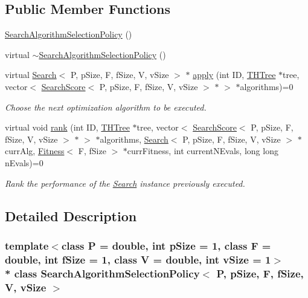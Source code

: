 \subsection*{Public Member Functions}
\begin{DoxyCompactItemize}
\item 
\hyperlink{classSearchAlgorithmSelectionPolicy_aeb650cf636c331f5842eb5acfc963a35}{Search\+Algorithm\+Selection\+Policy} ()
\item 
virtual \hyperlink{classSearchAlgorithmSelectionPolicy_a34e87d6c833a38bb19992aeed37205b2}{$\sim$\+Search\+Algorithm\+Selection\+Policy} ()
\item 
virtual \hyperlink{classSearch}{Search}$<$ P, p\+Size, F, f\+Size, V, v\+Size $>$ $\ast$ \hyperlink{classSearchAlgorithmSelectionPolicy_a0f316179ba1d9590efa74cac86eac777}{apply} (int ID, \hyperlink{classTHTree}{T\+H\+Tree} $\ast$tree, vector$<$ \hyperlink{classSearchScore}{Search\+Score}$<$ P, p\+Size, F, f\+Size, V, v\+Size $>$ $\ast$ $>$ $\ast$algorithms)=0
\begin{DoxyCompactList}\small\item\em Choose the next optimization algorithm to be executed. \end{DoxyCompactList}\item 
virtual void \hyperlink{classSearchAlgorithmSelectionPolicy_a6b590e565ce6d9f64a1351f2d233b679}{rank} (int ID, \hyperlink{classTHTree}{T\+H\+Tree} $\ast$tree, vector$<$ \hyperlink{classSearchScore}{Search\+Score}$<$ P, p\+Size, F, f\+Size, V, v\+Size $>$ $\ast$ $>$ $\ast$algorithms, \hyperlink{classSearch}{Search}$<$ P, p\+Size, F, f\+Size, V, v\+Size $>$ $\ast$curr\+Alg, \hyperlink{structFitness}{Fitness}$<$ F, f\+Size $>$ $\ast$curr\+Fitness, int current\+N\+Evals, long long n\+Evals)=0
\begin{DoxyCompactList}\small\item\em Rank the performance of the \hyperlink{classSearch}{Search} instance previously executed. \end{DoxyCompactList}\end{DoxyCompactItemize}


\subsection{Detailed Description}
\subsubsection*{template$<$class P = double, int p\+Size = 1, class F = double, int f\+Size = 1, class V = double, int v\+Size = 1$>$\\*
class Search\+Algorithm\+Selection\+Policy$<$ P, p\+Size, F, f\+Size, V, v\+Size $>$}

